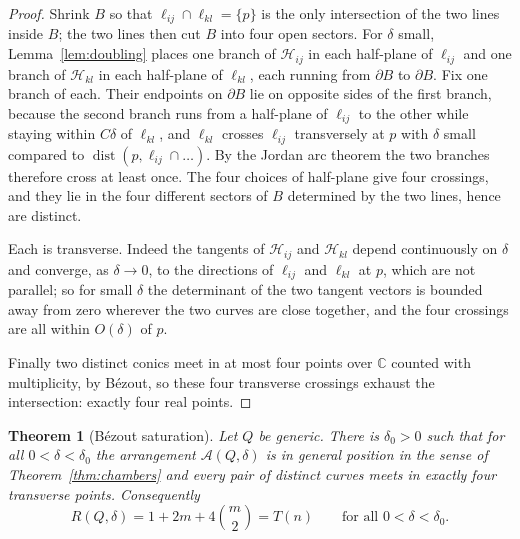 ﻿\documentclass[11pt,a4paper]{article}
\newtheorem{theorem}{Theorem}[section]
\theoremstyle{definition}
\theoremstyle{remark}
\newcommand{\CC}{\mathbb{C}}
\newcommand{\HH}{\mathcal{H}}
\newcommand{\ARR}{\mathcal{A}}
\begin{document}
\begin{proof}
Shrink $B$ so that $\ell_{ij}\cap\ell_{kl}=\{p\}$ is the only intersection of
the two lines inside $B$; the two lines then cut $B$ into four open sectors.
For $\delta$ small, Lemma~\ref{lem:doubling} places one branch of $\HH_{ij}$ in
each half-plane of $\ell_{ij}$ and one branch of $\HH_{kl}$ in each half-plane of
$\ell_{kl}$, each running from $\partial B$ to $\partial B$.  Fix one branch of
each.  Their endpoints on $\partial B$ lie on opposite sides of the first branch,
because the second branch runs from a half-plane of $\ell_{ij}$ to the other while
staying within $C\delta$ of $\ell_{kl}$, and $\ell_{kl}$ crosses $\ell_{ij}$
transversely at $p$ with $\delta$ small compared to $\operatorname{dist}(p,
\ell_{ij}\cap\ldots)$.  By the Jordan arc theorem the two branches therefore
cross at least once.  The four choices of half-plane give four crossings, and
they lie in the four different sectors of $B$ determined by the two lines, hence
are distinct.

Each is transverse.  Indeed the tangents of $\HH_{ij}$ and $\HH_{kl}$ depend
continuously on $\delta$ and converge, as $\delta\to0$, to the directions of
$\ell_{ij}$ and $\ell_{kl}$ at $p$, which are not parallel; so for small
$\delta$ the determinant of the two tangent vectors is bounded away from zero
wherever the two curves are close together, and the four crossings are all
within $O(\delta)$ of $p$.

Finally two distinct conics meet in at most four points over $\CC$ counted with
multiplicity, by B\'ezout, so these four transverse crossings exhaust the
intersection: exactly four real points.
\end{proof}

\begin{theorem}[B\'ezout saturation]\label{thm:saturation}
Let $Q$ be generic.  There is $\delta_0>0$ such that for all
$0<\delta<\delta_0$ the arrangement $\ARR(Q,\delta)$ is in general position in
the sense of Theorem~\ref{thm:chambers} and every pair of distinct curves meets
in exactly four transverse points.  Consequently
\[
R(Q,\delta)=1+2m+4\binom m2=T(n)
\qquad\text{for all }0<\delta<\delta_0 .
\]
\end{theorem}
\end{document}
